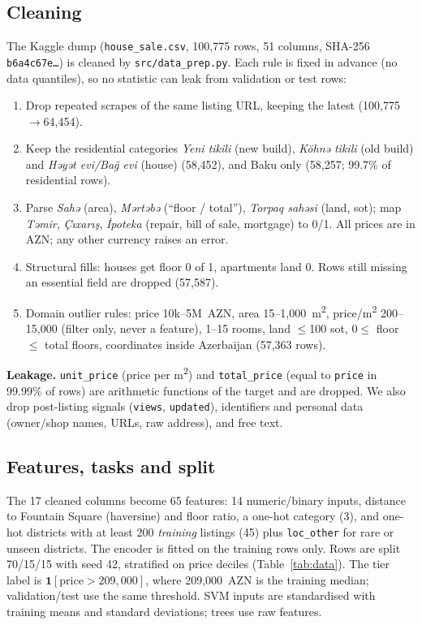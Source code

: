 \documentclass[10pt,twocolumn,a4paper]{article}
\begin{document}
\subsection{Cleaning}
The Kaggle dump (\texttt{house\_sale.csv}, 100,775 rows, 51 columns,
SHA-256 \texttt{b6a4c67e\ldots}) is cleaned by \texttt{src/data\_prep.py}.
Each rule is fixed in advance (no data quantiles), so no statistic can leak
from validation or test rows:
\begin{enumerate}
  \item Drop repeated scrapes of the same listing URL, keeping the latest
        (100,775$\to$64,454).
  \item Keep the residential categories \emph{Yeni tikili} (new build),
        \emph{Köhnə tikili} (old build) and \emph{Həyət evi/Bağ evi} (house)
        (58,452), and Baku only (58,257; 99.7\% of residential rows).
  \item Parse \emph{Sahə} (area), \emph{Mərtəbə} (``floor / total''),
        \emph{Torpaq sahəsi} (land, sot); map \emph{Təmir}, \emph{Çıxarış},
        \emph{İpoteka} (repair, bill of sale, mortgage) to 0/1. All prices are
        in AZN; any other currency raises an error.
  \item Structural fills: houses get floor 0 of 1, apartments land 0. Rows
        still missing an essential field are dropped (57,587).
  \item Domain outlier rules: price 10k--5M~AZN, area 15--1,000~m\textsuperscript{2},
        price/m\textsuperscript{2} 200--15,000 (filter only, never a feature),
        1--15 rooms, land $\le$100 sot, $0\le$ floor $\le$ total floors,
        coordinates inside Azerbaijan (57,363 rows).
\end{enumerate}

\textbf{Leakage.} \texttt{unit\_price} (price per m\textsuperscript{2}) and
\texttt{total\_price} (equal to \texttt{price} in 99.99\% of rows) are
arithmetic functions of the target and are dropped. We also drop post-listing
signals (\texttt{views}, \texttt{updated}), identifiers and personal data
(owner/shop names, URLs, raw address), and free text.

\subsection{Features, tasks and split}
The 17 cleaned columns become 65 features: 14 numeric/binary inputs,
distance to Fountain Square (haversine) and floor ratio, a one-hot category
(3), and one-hot districts with at least 200 \emph{training} listings (45)
plus \texttt{loc\_other} for rare or unseen districts. The encoder is fitted on
the training rows only. Rows are split 70/15/15 with seed 42, stratified on
price deciles (Table~\ref{tab:data}). The tier label is
$\mathbf{1}[\text{price} > 209{,}000]$, where 209,000~AZN is the training
median; validation/test use the same threshold. SVM inputs are standardised
with training means and standard deviations; trees use raw features.
\end{document}
